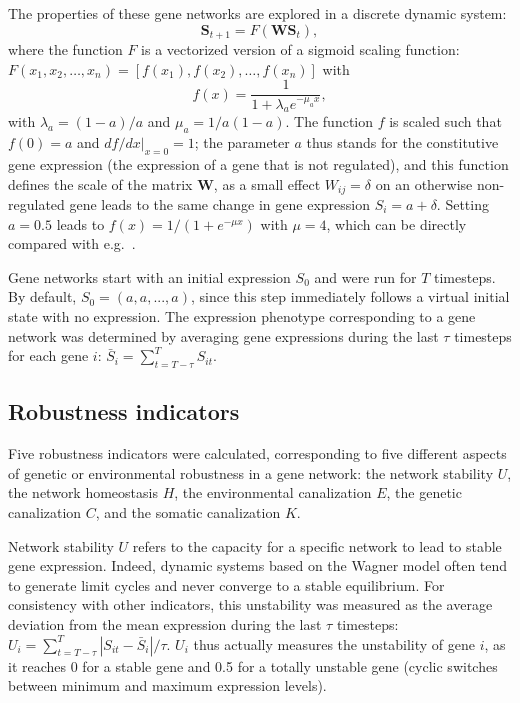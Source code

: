 \documentclass{article}
\begin{document}
The properties of these gene networks are explored in a discrete dynamic system:
\begin{equation}
 \bm S_{t+1} = F(\bm W \bm S_t),
\end{equation}
\noindent where the function $F$ is a vectorized version of a sigmoid scaling function: $F(x_1, x_2, \dots, x_n) = [f(x_1), f(x_2), \dots, f(x_n)]$ with
\begin{equation} \label{eq:fx}
f(x) = \frac{1}{1+ \lambda_a e ^{- \mu_a x}}, 
\end{equation}
\noindent with $\lambda_a = (1-a)/a$ and $\mu_a = 1/a(1-a)$. The function $f$ is scaled such that $f(0) = a$ and $df/dx|_{x=0}=1$; the parameter $a$ thus stands for the constitutive gene expression (the expression of a gene that is not regulated), and this function defines the scale of the matrix $\bm W$, as a small effect $W_{ij} = \delta$ on an otherwise non-regulated gene leads to the same change in gene expression $S_i = a+\delta$. Setting $a=0.5$ leads to $f(x) = 1/(1+e^{-\mu x})$ with $\mu = 4$, which can be directly compared with e.g.\ \cite{PBF12}. 

Gene networks start with an initial expression $S_0$ and were run for $T$ timesteps. By default, $S_0 = (a, a, ..., a)$, since this step immediately follows a virtual initial state with no expression. The expression phenotype corresponding to a gene network was determined by averaging gene expressions during the last $\tau$ timesteps for each gene $i$: $\bar S_i = \sum_{t=T-\tau}^T S_{it}$. 

\subsection{Robustness indicators}

Five robustness indicators were calculated, corresponding to five different aspects of genetic or environmental robustness in a gene network: the network stability $U$, the network homeostasis $H$, the environmental canalization $E$, the genetic canalization $C$, and the somatic canalization $K$. 

Network stability $U$ refers to the capacity for a specific network to lead to stable gene expression. Indeed, dynamic systems based on the Wagner model often tend to generate limit cycles and never converge to a stable equilibrium. For consistency with other indicators, this unstability was measured as the average deviation from the mean expression during the last $\tau$ timesteps: $U_i = \sum_{t=T-\tau}^T |S_{it}-\bar S_i| / \tau$. $U_i$ thus actually measures the unstability of gene $i$, as it reaches 0 for a stable gene and 0.5 for a totally unstable gene (cyclic switches between minimum and maximum expression levels). 
\end{document}
